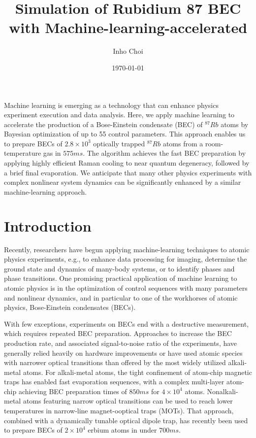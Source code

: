 \documentclass{article}
\title{Simulation of Rubidium 87 BEC with Machine-learning-accelerated}
\author{Inho Choi}
\date{\today}
\begin{document}
\maketitle
\abstract{}
Machine learning is emerging as a technology that can enhance physics experiment execution and data analysis. Here, we apply machine learning to accelerate the production of a Bose-Einstein condensate (BEC) of $^{87}Rb$ atoms by Bayesian optimization of up to 55 control parameters. This approach enables us to prepare BECs of $2.8 \times 10^3$ optically trapped $^{87}Rb$ atoms from a room-temperature gas in $575 ms$. The algorithm achieves the fast BEC preparation by applying highly efficient Raman cooling to near quantum degeneracy, followed by a brief final evaporation. We anticipate that many other physics experiments with complex nonlinear system dynamics can be significantly enhanced by a similar machine-learning approach.

\section{Introduction}

Recently, researchers have begun applying machine-learning techniques to atomic physics experiments, e.g., to enhance data processing for imaging, determine the ground state and dynamics of many-body systems, or to identify phases and phase transitions. One promising practical application of machine learning to atomic physics is in the optimization of control sequences with many parameters and nonlinear dynamics, and in particular to one of the workhorses of atomic physics, Bose-Einstein condensates (BECs).

With few exceptions, experiments on BECs end with a destructive measurement, which requires repeated BEC preparation. Approaches to increase the BEC production rate, and associated signal-to-noise ratio of the experiments, have generally relied heavily on hardware improvements or have used atomic species with narrower optical transitions than offered by the most widely utilized alkali-metal atoms. For alkali-metal atoms, the tight confinement of atom-chip magnetic traps has enabled fast evaporation sequences, with a complex multi-layer atom-chip achieving BEC preparation times of $850 ms$ for $4 \times 10^4$ atoms. Nonalkali- metal atoms featuring narrow optical transitions can be used to reach lower temperatures in narrow-line magnet-ooptical traps (MOTs). That approach, combined with a dynamically tunable optical dipole trap, has recently been used to prepare BECs of $2 \times 10^4$ erbium atoms in under $700 ms$.
\end{document}
